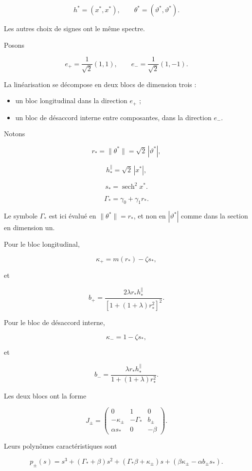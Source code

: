 \[
h^\ast=(x^\ast,x^\ast),
\qquad
\theta^\ast=(\vartheta^\ast,\vartheta^\ast).
\]

Les autres choix de signes ont le même spectre.

Posons

\[
e_+
=
\frac{1}{\sqrt2}(1,1),
\qquad
e_-
=
\frac{1}{\sqrt2}(1,-1).
\]

La linéarisation se décompose en deux blocs de dimension trois :

\begin{itemize}
\item
  un bloc longitudinal dans la direction \(e_+\) ;
\item
  un bloc de désaccord interne entre composantes, dans la direction \(e_-\).
\end{itemize}

Notons

\[
r_\ast
=
\|\theta^\ast\|
=
\sqrt2\,|\vartheta^\ast|,
\]

\[
h_\ast^\parallel
=
\sqrt2\,|x^\ast|,
\]

\[
s_\ast
=
\operatorname{sech}^2x^\ast.
\]

\[
\Gamma_\ast
=
\gamma_0+\gamma_1 r_\ast .
\]

Le symbole \(\Gamma_\ast\) est ici évalué en \(\|\theta^\ast\|=r_\ast\), et
non en \(|\vartheta^\ast|\) comme dans la section en dimension un.

Pour le bloc longitudinal,

\[
\kappa_+
=
m(r_\ast)-\zeta s_\ast,
\]

et

\[
b_+
=
\frac{
2\lambda r_\ast h_\ast^\parallel
}{
\left[
1+(1+\lambda)r_\ast^2
\right]^2
}.
\]

Pour le bloc de désaccord interne,

\[
\kappa_-
=
1-\zeta s_\ast,
\]

et

\[
b_-
=
\frac{
\lambda r_\ast h_\ast^\parallel
}{
1+(1+\lambda)r_\ast^2
}.
\]

Les deux blocs ont la forme

\[
J_\pm
=
\begin{pmatrix}
0&1&0\\
-\kappa_\pm&-\Gamma_\ast&b_\pm\\
\alpha s_\ast&0&-\beta
\end{pmatrix}.
\]

Leurs polynômes caractéristiques sont

\[
p_\pm(s)
=
s^3
+
(\Gamma_\ast+\beta)s^2
+
(\Gamma_\ast\beta+\kappa_\pm)s
+
\left(
\beta\kappa_\pm
-
\alpha b_\pm s_\ast
\right).
\]

